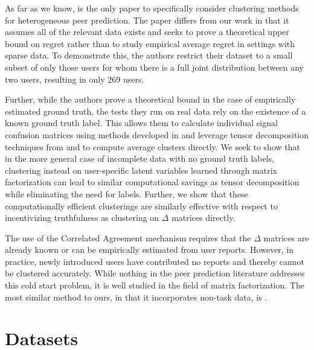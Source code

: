 \documentclass{article}
\begin{document}
As far as we know, \citep{agarwal2017} is the only paper to specifically consider clustering methods for heterogeneous peer prediction. The paper differs from our work in that it assumes all of the relevant data exists and seeks to prove a theoretical upper bound on regret rather than to study empirical average regret in settings with sparse data. To demonstrate this, the authors restrict their dataset to a small subset of only those users for whom there is a full joint distribution between any two users, resulting in only 269 users. 

Further, while the authors prove a theoretical bound in the case of empirically estimated ground truth, the tests they run on real data rely on the existence of a known ground truth label. This allows them to calculate individual signal confusion matrices using methods developed in \citet{dawid1979maximum} and leverage tensor decomposition techniques from \citet{anandkumar2014tensor} and \citet{zhang2016spectral} to compute average clusters directly. We seek to show that in the more general case of incomplete data with no ground truth labels, clustering instead on user-specific latent variables learned through matrix factorization can lead to similar computational savings as tensor decomposition while eliminating the need for labels.  Further, we show that these computationally efficient clusterings are similarly effective with respect to incentivizing truthfulness as clustering on $\Delta$ matrices directly.

The use of the Correlated Agreement mechanism \citep{shnayder2016informed} requires that the $\Delta$ matrices are already known or can be empirically estimated from user reports. However, in practice, newly introduced users have contributed no reports and thereby cannot be clustered accurately. While nothing in the peer prediction literature addresses this cold start problem, it is well studied in the field of matrix factorization. The most similar method to ours, in that it incorporates non-task data, is \citep{kula2015metadata}. 


\section{Datasets}
\end{document}
